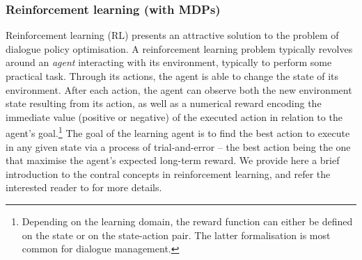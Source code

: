 
\subsubsection*{Reinforcement learning (with MDPs)}

Reinforcement learning (RL) presents an attractive solution to the problem of dialogue policy optimisation.  A reinforcement learning problem typically revolves around an \textit{agent} interacting with its environment, typically to perform some practical task.  Through its actions, the agent is able to change the state of its environment.  After each action, the agent can observe both the new environment state resulting from its action, as well as a numerical reward encoding the immediate value (positive or negative) of the executed action in relation to the agent's goal.\footnote{Depending on the learning domain, the reward function can either be defined on the state or on the state-action pair.  The latter formalisation is most common for dialogue management.} The goal of the learning agent is to find the best action to execute in any given state via a process of trial-and-error  -- the best action being the one that maximise the agent's expected long-term reward.  We provide here a brief introduction to the contral concepts in reinforcement learning, and refer the interested reader to \cite{citeulike:112017} for more details. 


